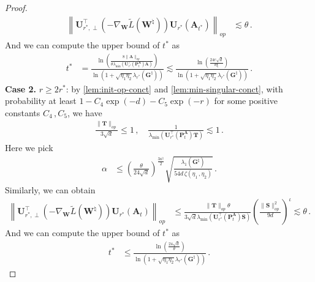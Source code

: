\begin{proof}
\begin{align*}
        \left\|\bm U^{\!\top}_{r^*,\perp}\left(-\nabla_{\bm W}\widetilde{L}(\bm W^\natural)\right)\bm U_{r^*}\left(\bm A_{t^*}\right)\right\|_{op} & \lesssim \theta\,.
    \end{align*}
    And we can compute the upper bound of $t^*$ as
    \begin{align*}
        t^* &
        = \frac{\ln\left(\frac{8\|\bm A\|_{op}}{\theta \lambda_{\min}(\bm U^{\!\top}_{r^*}(\bm P_t^{\bm A}) \bm A)}\right)}{\ln\left(1+\sqrt{\eta_1 \eta_2}\lambda_{r^*}\left({\bm G}^{\natural}\right)\right)}
        \lesssim \frac{\ln\left(\frac{24r\sqrt{d}}{\theta \xi}\right)}{\ln\left(1+\sqrt{\eta_1 \eta_2}\lambda_{r^*}\left({\bm G}^{\natural}\right)\right)}\,.
    \end{align*}
   {\bf Case 2.} $r \geq 2r^*$: by \cref{lem:init-op-conct} and \cref{lem:min-singular-conct}, with probability at least $1-C_4 \exp(-d)-C_5 \exp(- r)$ for some positive constants $C_4\,,C_5$, we have
    \begin{align*}
        \frac{\|\bm T \|_{op}}{3\sqrt{d}} \leq 1\,,\quad \frac{1}{\lambda_{\min}(\bm U^{\!\top}_{r^*}(\bm P_t^{\bm A}) \bm T)} \lesssim 1\,.
    \end{align*}
   Here we pick
    \begin{align*}
        \alpha & \leq \left(\frac{\theta}{24\sqrt{d}}\right)^{\frac{3\kappa^\natural}{2}}\sqrt{\frac{\lambda_1({\bm G}^{\natural})}{54d\,\zeta(\eta_1\,,\eta_2)}}\,.
    \end{align*}
    Similarly, we can obtain
    \begin{align*}
        \left\|\bm U^{\!\top}_{r^*,\perp}\left(-\nabla_{\bm W}\widetilde{L}(\bm W^\natural)\right)\bm U_{r^*}\left(\bm A_t\right)\right\|_{op} & \leq \frac{\|\bm T \|_{op}\theta}{3\sqrt{d}\lambda_{\min}(\bm U^{\!\top}_{r^*}(\bm P_t^{\bm A}) \bm S)} \left(\frac{\|\bm S\|_{op}^2}{9d}\right)^\iota \lesssim \theta\,.
    \end{align*}
    And we can compute the upper bound of $t^*$ as
    \begin{align*}
        t^* &
        \leq \frac{\ln\left(\frac{24\sqrt{d}}{\theta}\right)}{\ln\left(1+\sqrt{\eta_1 \eta_2}\lambda_{r^*}\left({\bm G}^{\natural}\right)\right)}\,.
    \end{align*}
\end{proof}


